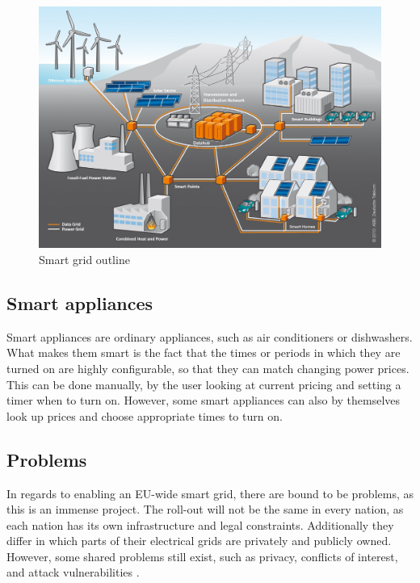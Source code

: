 \begin{figure}
	\includegraphics[width=\textwidth]{figures/SmartGrid_Ueberblick_ohneLegende.jpg}
	\caption{Smart grid outline\protect\footnotemark}
	\label{fig:background:smartgrid}
\end{figure}

\subsection{Smart appliances}
\label{background:smart_appliances}
Smart appliances\cite{smart_appliances} are ordinary appliances, such as air conditioners or dishwashers.
What makes them smart is the fact that the times or periods in which they are turned on are highly configurable, so that they can match changing power prices.
This can be done manually, by the user looking at current pricing and setting a timer when to turn on.
However, some smart appliances can also by themselves look up prices and choose appropriate times to turn on.

\subsection{Problems}
In regards to enabling an EU-wide smart grid, there are bound to be problems, as this is an immense project.
The roll-out will not be the same in every nation, as each nation has its own infrastructure and legal constraints.
Additionally they differ in which parts of their electrical grids are privately and publicly owned.
However, some shared problems still exist, such as privacy, conflicts of interest, and attack vulnerabilities \cite{offswitch, smart_meter_survey, security_economics}.

